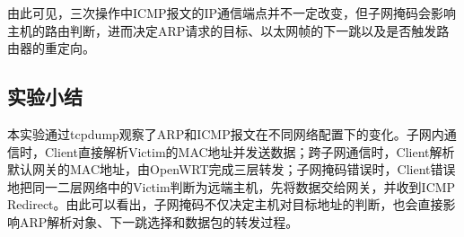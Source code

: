 由此可见，三次操作中ICMP报文的IP通信端点并不一定改变，但子网掩码会影响主机的路由判断，进而决定ARP请求的目标、以太网帧的下一跳以及是否触发路由器的重定向。

\subsection{实验小结}

本实验通过tcpdump观察了ARP和ICMP报文在不同网络配置下的变化。子网内通信时，Client直接解析Victim的MAC地址并发送数据；跨子网通信时，Client解析默认网关的MAC地址，由OpenWRT完成三层转发；子网掩码错误时，Client错误地把同一二层网络中的Victim判断为远端主机，先将数据交给网关，并收到ICMP Redirect。由此可以看出，子网掩码不仅决定主机对目标地址的判断，也会直接影响ARP解析对象、下一跳选择和数据包的转发过程。
